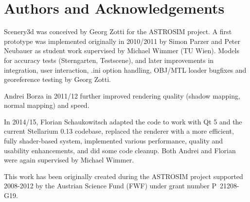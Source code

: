 \documentclass[a4paper]{article}
\begin{document}
\section*{Authors and Acknowledgements}
\label{Acknowledgments}


Scenery3d was conceived by Georg Zotti for the ASTROSIM project. A first prototype was
implemented originally in 2010/2011 by Simon Parzer and Peter Neubauer as
student work supervised by Michael Wimmer (TU Wien). 
Models for accuracy tests (Sterngarten, Testscene), and later improvements in
integration, user interaction, .ini option handling, OBJ/MTL loader bugfixes and
georeference testing by Georg Zotti. 

Andrei Borza in 2011/12 further improved
rendering quality (shadow mapping, normal mapping) and speed. 

In 2014/15,
Florian Schaukowitsch adapted the code to work with Qt 5 and the current
Stellarium 0.13 codebase, replaced the renderer with a more efficient, fully
shader-based system, implemented various performance, quality and usability
enhancements, and did some code cleanup. Both Andrei and Florian were again
supervised by Michael Wimmer.

This work has been originally created during the ASTROSIM project supported 2008-2012 by
the Austrian Science Fund (FWF) under grant number P~21208-G19.
\end{document}
